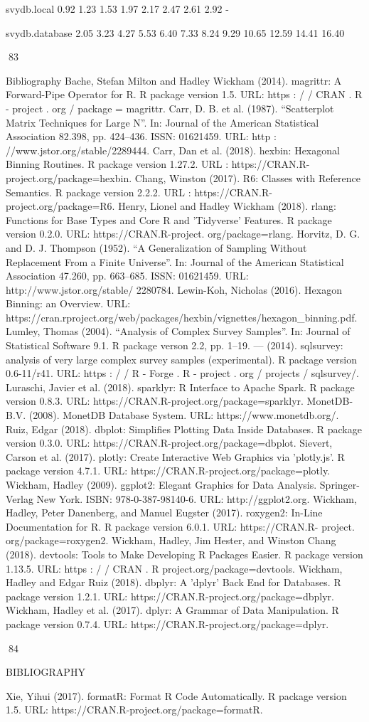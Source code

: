 svydb.local
0.92
1.23
1.53
1.97
2.17
2.47
2.61
2.92
-

svydb.database
2.05
3.23
4.27
5.53
6.40
7.33
8.24
9.29
10.65
12.59
14.41
16.40

83

Bibliography
Bache, Stefan Milton and Hadley Wickham (2014). magrittr: A Forward-Pipe Operator
for R. R package version 1.5. URL: https : / / CRAN . R - project . org / package =
magrittr.
Carr, D. B. et al. (1987). “Scatterplot Matrix Techniques for Large N”. In: Journal of the
American Statistical Association 82.398, pp. 424–436. ISSN: 01621459. URL: http :
//www.jstor.org/stable/2289444.
Carr, Dan et al. (2018). hexbin: Hexagonal Binning Routines. R package version 1.27.2.
URL : https://CRAN.R-project.org/package=hexbin.
Chang, Winston (2017). R6: Classes with Reference Semantics. R package version 2.2.2.
URL : https://CRAN.R-project.org/package=R6.
Henry, Lionel and Hadley Wickham (2018). rlang: Functions for Base Types and Core R
and ’Tidyverse’ Features. R package version 0.2.0. URL: https://CRAN.R-project.
org/package=rlang.
Horvitz, D. G. and D. J. Thompson (1952). “A Generalization of Sampling Without
Replacement From a Finite Universe”. In: Journal of the American Statistical Association 47.260, pp. 663–685. ISSN: 01621459. URL: http://www.jstor.org/stable/
2280784.
Lewin-Koh, Nicholas (2016). Hexagon Binning: an Overview. URL: https://cran.rproject.org/web/packages/hexbin/vignettes/hexagon_binning.pdf.
Lumley, Thomas (2004). “Analysis of Complex Survey Samples”. In: Journal of Statistical Software 9.1. R package verson 2.2, pp. 1–19.
— (2014). sqlsurvey: analysis of very large complex survey samples (experimental). R package version 0.6-11/r41. URL: https : / / R - Forge . R - project . org / projects /
sqlsurvey/.
Luraschi, Javier et al. (2018). sparklyr: R Interface to Apache Spark. R package version
0.8.3. URL: https://CRAN.R-project.org/package=sparklyr.
MonetDB-B.V. (2008). MonetDB Database System. URL: https://www.monetdb.org/.
Ruiz, Edgar (2018). dbplot: Simplifies Plotting Data Inside Databases. R package version
0.3.0. URL: https://CRAN.R-project.org/package=dbplot.
Sievert, Carson et al. (2017). plotly: Create Interactive Web Graphics via ’plotly.js’. R
package version 4.7.1. URL: https://CRAN.R-project.org/package=plotly.
Wickham, Hadley (2009). ggplot2: Elegant Graphics for Data Analysis. Springer-Verlag
New York. ISBN: 978-0-387-98140-6. URL: http://ggplot2.org.
Wickham, Hadley, Peter Danenberg, and Manuel Eugster (2017). roxygen2: In-Line
Documentation for R. R package version 6.0.1. URL: https://CRAN.R- project.
org/package=roxygen2.
Wickham, Hadley, Jim Hester, and Winston Chang (2018). devtools: Tools to Make Developing R Packages Easier. R package version 1.13.5. URL: https : / / CRAN . R project.org/package=devtools.
Wickham, Hadley and Edgar Ruiz (2018). dbplyr: A ’dplyr’ Back End for Databases. R
package version 1.2.1. URL: https://CRAN.R-project.org/package=dbplyr.
Wickham, Hadley et al. (2017). dplyr: A Grammar of Data Manipulation. R package
version 0.7.4. URL: https://CRAN.R-project.org/package=dplyr.

84

BIBLIOGRAPHY

Xie, Yihui (2017). formatR: Format R Code Automatically. R package version 1.5. URL:
https://CRAN.R-project.org/package=formatR.

